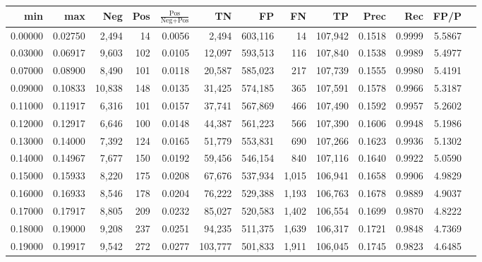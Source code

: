 \begin{tabular}{rrrrrrrrrrrrr}
\toprule
    min &     max &    Neg &   Pos & $\frac{\text{Pos}}{\text{Neg}+\text{Pos}}$ &      TN &      FP &      FN &      TP &   Prec &    Rec &   FP/P \\
\midrule
0.00000 & 0.02750 &  2,494 &    14 &                                     0.0056 &   2,494 & 603,116 &      14 & 107,942 & 0.1518 & 0.9999 & 5.5867 \\
0.03000 & 0.06917 &  9,603 &   102 &                                     0.0105 &  12,097 & 593,513 &     116 & 107,840 & 0.1538 & 0.9989 & 5.4977 \\
0.07000 & 0.08900 &  8,490 &   101 &                                     0.0118 &  20,587 & 585,023 &     217 & 107,739 & 0.1555 & 0.9980 & 5.4191 \\
0.09000 & 0.10833 & 10,838 &   148 &                                     0.0135 &  31,425 & 574,185 &     365 & 107,591 & 0.1578 & 0.9966 & 5.3187 \\
0.11000 & 0.11917 &  6,316 &   101 &                                     0.0157 &  37,741 & 567,869 &     466 & 107,490 & 0.1592 & 0.9957 & 5.2602 \\
0.12000 & 0.12917 &  6,646 &   100 &                                     0.0148 &  44,387 & 561,223 &     566 & 107,390 & 0.1606 & 0.9948 & 5.1986 \\
0.13000 & 0.14000 &  7,392 &   124 &                                     0.0165 &  51,779 & 553,831 &     690 & 107,266 & 0.1623 & 0.9936 & 5.1302 \\
0.14000 & 0.14967 &  7,677 &   150 &                                     0.0192 &  59,456 & 546,154 &     840 & 107,116 & 0.1640 & 0.9922 & 5.0590 \\
0.15000 & 0.15933 &  8,220 &   175 &                                     0.0208 &  67,676 & 537,934 &   1,015 & 106,941 & 0.1658 & 0.9906 & 4.9829 \\
0.16000 & 0.16933 &  8,546 &   178 &                                     0.0204 &  76,222 & 529,388 &   1,193 & 106,763 & 0.1678 & 0.9889 & 4.9037 \\
0.17000 & 0.17917 &  8,805 &   209 &                                     0.0232 &  85,027 & 520,583 &   1,402 & 106,554 & 0.1699 & 0.9870 & 4.8222 \\
0.18000 & 0.19000 &  9,208 &   237 &                                     0.0251 &  94,235 & 511,375 &   1,639 & 106,317 & 0.1721 & 0.9848 & 4.7369 \\
0.19000 & 0.19917 &  9,542 &   272 &                                     0.0277 & 103,777 & 501,833 &   1,911 & 106,045 & 0.1745 & 0.9823 & 4.6485 \\

\end{tabular}
